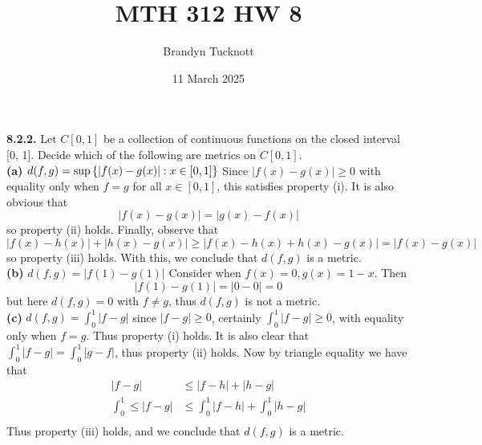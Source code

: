 \documentclass{exam}
\title{MTH 312 HW 8}
\author{Brandyn Tucknott}
\date{11 March 2025}
\begin{document}
\maketitle

\begin{questions}
    \textbf{8.2.2. } Let $C[0, 1]$ be a collection of continuous functions on the closed interval [0, 1]. Decide which of the following are metrics on $C[0, 1]$. \\

\newline
\textbf{(a) } $d(f, g) = \sup \left \{ |f(x) - g(x)| : x \in [0, 1] \right \}$
\sol
Since $|f(x) - g(x)| \geq 0$ with equality only when $f = g$ for all $x\in[0, 1]$, this satisfies property (i). It is also obvious that 
$$|f(x) - g(x)| = |g(x) - f(x)|$$
so property (ii) holds. Finally, observe that 
$$|f(x) - h(x)| + |h(x) - g(x)| \geq |f(x) - h(x) + h(x) - g(x)| = |f(x) - g(x)|$$
so property (iii) holds. With this, we conclude that $d(f, g)$ is a metric.\\

\newline
\textbf{(b) } $d(f, g) = |f(1) - g(1)|$
\sol
Consider when $f(x) = 0, g(x) = 1 - x$. Then
$$|f(1) - g(1)| = |0 - 0| = 0$$
but here $d(f, g) = 0$ with $f \neq g$, thus $d(f, g)$ is not a metric.\\

\newline
\textbf{(c) } $d(f, g) = \int_0^1 |f - g|$
\sol
since $|f - g|\geq 0$, certainly $\int_0^1 |f - g| \geq 0$, with equality only when $f = g$. Thus property (i) holds. It is also clear that $\int_0^1 |f - g| = \int_0^1 |g - f|$, thus property (ii) holds. Now by triangle equality we have that
\begin{align*}
    |f - g| &\leq |f - h| + |h - g| \\
    \int_0^1 \leq |f - g| &\leq \int_0^1 |f - h| + \int_0^1 |h - g| \\
\end{align*}
Thus property (iii) holds, and we conclude that $d(f, g)$ is a metric.


\end{questions}
\end{document}
